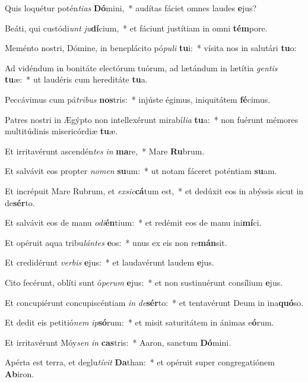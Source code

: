 \item Quis loquétur potén\textit{ti}\textit{as} \textbf{Dó}mini,~* audítas fáciet omnes laudes \textbf{e}jus?
\item Beáti, qui custódi\textit{unt} \textit{ju}\textbf{dí}cium,~* et fáciunt justítiam in omni \textbf{tém}pore.
\item Meménto nostri, Dómine, in beneplácito pó\textit{pu}\textit{li} \textbf{tu}i:~* vísita nos in salutári \textbf{tu}o:
\item Ad vidéndum in bonitáte electórum tuórum, ad lætándum in lætítia \textit{gen}\textit{tis} \textbf{tu}æ:~* ut laudéris cum hereditáte \textbf{tu}a.
\item Peccávimus cum pá\textit{tri}\textit{bus} \textbf{nos}tris:~* injúste égimus, iniquitátem \textbf{fé}cimus.
\item Patres nostri in Ægýpto non intellexérunt mirabí\textit{li}\textit{a} \textbf{tu}a:~* non fuérunt mémores multitúdinis misericórdiæ \textbf{tu}æ.
\item Et irritavérunt ascendén\textit{tes} \textit{in} \textbf{ma}re,~* Mare \textbf{Ru}brum.
\item Et salvávit eos propter \textit{no}\textit{men} \textbf{su}um:~* ut notam fáceret poténtiam \textbf{su}am.
\item Et incrépuit Mare Rubrum, et \textit{ex}\textit{sic}\textbf{cá}tum est,~* et dedúxit eos in abýssis sicut in de\textbf{sér}to.
\item Et salvávit eos de manu \textit{o}\textit{di}\textbf{én}tium:~* et redémit eos de manu ini\textbf{mí}ci.
\item Et opéruit aqua tribu\textit{lán}\textit{tes} \textbf{e}os:~* unus ex eis non re\textbf{mán}sit.
\item Et credidérunt \textit{ver}\textit{bis} \textbf{e}jus:~* et laudavérunt laudem \textbf{e}jus.
\item Cito fecérunt, oblíti sunt ó\textit{pe}\textit{rum} \textbf{e}jus:~* et non sustinuérunt consílium \textbf{e}jus.
\item Et concupiérunt concupiscéntiam \textit{in} \textit{de}\textbf{sér}to:~* et tentavérunt Deum in ina\textbf{quó}so.
\item Et dedit eis petitió\textit{nem} \textit{ip}\textbf{só}rum:~* et misit saturitátem in ánimas e\textbf{ó}rum.
\item Et irritavérunt Móy\textit{sen} \textit{in} \textbf{cas}tris:~* Aaron, sanctum \textbf{Dó}mini.
\item Apérta est terra, et deglu\textit{tí}\textit{vit} \textbf{Da}than:~* et opéruit super congregatiónem \textbf{Ab}iron.
